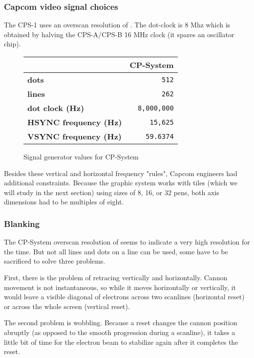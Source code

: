\subsubsection{Capcom video signal choices}

The CPS-1 uses an overscan resolution of . The dot-clock is 8 Mhz which is obtained by halving the CPS-A/CPS-B 16 MHz clock (it spares an oscillator chip).

\begin{figure}[H]
{ \setlength{\tabcolsep}{3.0pt}
\begin{tabularx}{\textwidth}{Xr} 
  \textbf{ } & \textbf{CP-System} \\
  \toprule    
   \textbf{dots} & \texttt{512} \\
   \textbf{lines} & \texttt{262} \\
   \textbf{dot clock (Hz)} & \texttt{8,000,000} \\
\toprule    
   \textbf{HSYNC frequency (Hz)} & \texttt{15,625} \\
   \textbf{VSYNC frequency (Hz)} & \texttt{59.6374} \\
\toprule    

\end{tabularx}%
}\caption*{Signal generator values for CP-System}
\end{figure}

Besides these vertical and horizontal frequency "rules", Capcom engineers had additional constraints. Because the graphic system works with tiles (which we will study in the next section) using sizes of 8, 16, or 32 pens, both axis dimensions had to be multiples of eight.

\subsubsection{Blanking}

The CP-System overscan resolution of  seems to indicate a very high resolution for the time. But not all lines and dots on a line can be used, some have to be sacrificed to solve three problems. 

First, there is the problem of retracing vertically and horizontally. Cannon movement is not instantaneous, so while it moves horizontally or vertically, it would leave a visible diagonal of electrons across two scanlines (horizontal reset) or across the whole screen (vertical reset).

The second problem is wobbling. Because a reset changes the cannon position abruptly (as opposed to the smooth progression during a scanline), it takes a little bit of time for the electron beam to stabilize again after it completes the reset.

